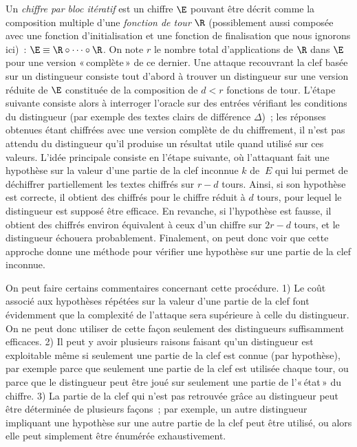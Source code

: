 Un  \emph{chiffre par bloc itératif} est un chiffre $\E$ pouvant être décrit comme la composition multiple
d'une \emph{fonction de tour} $\R$ (possiblement aussi composée avec une fonction d'initialisation et une fonction de finalisation
que nous ignorons ici)~:
$\E \equiv \R \circ \cdots \circ \R$. On note $r$ le nombre total d'applications de $\R$ dans $\E$ pour une version «\,complète\,» de ce dernier.
Une attaque recouvrant la clef basée sur un distingueur consiste tout d'abord à trouver un distingueur sur une version
réduite de $\E$ constituée de la composition de $d < r$ fonctions de tour. L'étape suivante consiste alors à interroger l'oracle sur
des entrées vérifiant les conditions du distingueur (par exemple des textes clairs de différence $\Delta$)~; les réponses obtenues étant chiffrées
avec une version complète de du chiffrement, il n'est pas attendu du distingueur qu'il produise un résultat utile quand utilisé sur ces valeurs.
L'idée principale consiste en l'étape suivante, où l'attaquant fait une hypothèse sur la valeur d'une partie de la clef inconnue $k$ de $\:E$
qui lui permet de déchiffrer partiellement les textes chiffrés sur $r-d$ tours. Ainsi, si son hypothèse est correcte, il obtient des chiffrés pour le
chiffre réduit à $d$ tours, pour lequel le distingueur est supposé être efficace. En revanche, si l'hypothèse est fausse,
il obtient des chiffrés environ équivalent à ceux d'un chiffre sur $2r - d$ tours, et le distingueur échouera probablement. Finalement, on peut donc
voir que cette approche donne une méthode pour vérifier une hypothèse sur une partie de la clef inconnue. 

On peut faire certains commentaires concernant cette procédure. 1) Le coût associé aux hypothèses répétées sur la valeur d'une partie de la clef
font évidemment que la complexité de l'attaque sera supérieure à celle du distingueur. On ne peut donc utiliser de cette façon seulement des distingueurs suffisamment
efficaces. 2) Il peut y avoir plusieurs raisons faisant qu'un distingueur est exploitable même si seulement une partie de la clef est connue (par hypothèse), par exemple
parce que seulement une partie de la clef est utilisée chaque tour, ou parce que le distingueur peut être joué sur seulement une partie de l'«\,état\,» du chiffre.
3) La partie de la clef qui n'est pas retrouvée grâce au distingueur peut être déterminée de plusieurs façons~; par exemple, un autre distingueur
impliquant une hypothèse sur une autre partie de la clef peut être utilisé, ou alors elle peut simplement être énumérée exhaustivement.


